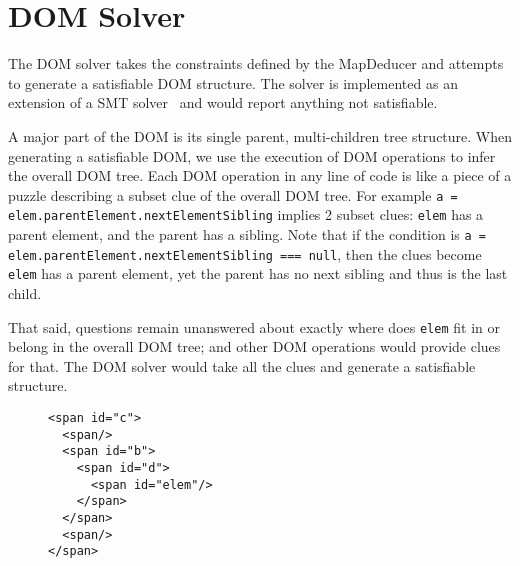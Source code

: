 \section{DOM Solver}
The DOM solver takes the constraints defined by the MapDeducer and attempts to generate a satisfiable DOM structure.  The solver is implemented as an extension of a SMT solver~\cite{cvc3} and would report anything not satisfiable.  

A major part of the DOM is its single parent, multi-children tree structure.  When generating a satisfiable DOM, we use the execution of DOM operations to infer the overall DOM tree.    
Each DOM operation in any line of code is like a piece of a puzzle describing a subset clue of the overall DOM tree.   
For example {\tt a = elem.parentElement.nextElementSibling} implies 2 subset clues: {\tt elem} has a parent element, and the parent has a sibling.  
Note that if the condition is {\tt a = elem.parentElement.nextElementSibling === null}, then the clues become {\tt elem} has a parent element, yet the parent has no next sibling and thus is the last child.

That said, questions remain unanswered about exactly where does {\tt elem} fit in or belong in the overall DOM tree; and other DOM operations would provide clues for that.  The DOM solver would take all the clues and generate a satisfiable structure.   

\begin{figure}
\begin{lstlisting}[caption=HTML generated for going the all {\tt true} path in Sample Code ~\ref{domOr}.  The all {\tt true} path is the execution path in which every condition goes to the {\tt true} branch.,label=htmlExtended]  
<span id="c">
  <span/>
  <span id="b">
    <span id="d">
      <span id="elem"/>
    </span>
  </span>
  <span/>
</span>
\end{lstlisting}
\end{figure}


	
